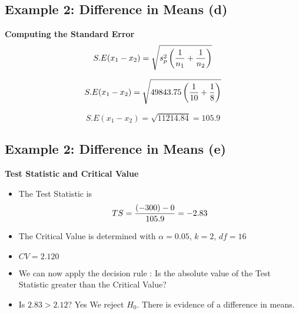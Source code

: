 \documentclass[a4paper,12pt]{article}
\begin{document}
\subsection*{Example 2: Difference in Means (d) }
\textbf{Computing the Standard Error}
\[ S.E(x_1 - x_2) = \sqrt{s^2_p \left({1\over n_1}+{1\over n_2} \right)}\]

\[ S.E(x_1 - x_2) = \sqrt{49843.75 \left({1\over 10}+{1\over 8} \right)}\]

\[ S.E(x_1 - x_2) = \sqrt{11214.84} = 105.9\]

\medskip


\subsection*{Example 2: Difference in Means (e) }
\textbf{Test Statistic and Critical Value}\\
\begin{itemize}
\item The Test Statistic is \[ TS  = {(-300) - 0 \over 105.9}  = -2.83 \]
\item The Critical Value is determined with $\alpha = 0.05$, $k=2$, $df = 16 $
\item $CV = 2.120$
\item We can now apply the decision rule : Is the absolute value of the Test Statistic greater than the Critical Value?
\item Is $2.83 > 2.12$? Yes We reject $H_0$. There is evidence of a difference in means.
\end{itemize}
\medskip
\end{document}
